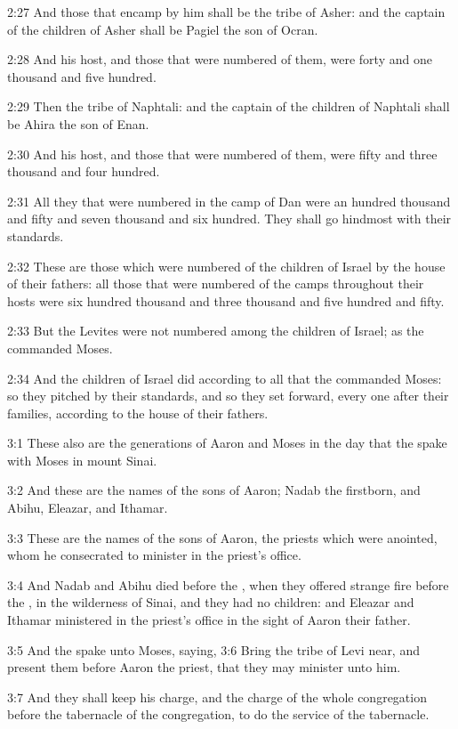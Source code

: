2:27 And those that encamp by him shall be the tribe of Asher: and the
captain of the children of Asher shall be Pagiel the son of Ocran.

2:28 And his host, and those that were numbered of them, were forty
and one thousand and five hundred.

2:29 Then the tribe of Naphtali: and the captain of the children of
Naphtali shall be Ahira the son of Enan.

2:30 And his host, and those that were numbered of them, were fifty
and three thousand and four hundred.

2:31 All they that were numbered in the camp of Dan were an hundred
thousand and fifty and seven thousand and six hundred. They shall go
hindmost with their standards.

2:32 These are those which were numbered of the children of Israel by
the house of their fathers: all those that were numbered of the camps
throughout their hosts were six hundred thousand and three thousand
and five hundred and fifty.

2:33 But the Levites were not numbered among the children of Israel;
as the \LORD commanded Moses.

2:34 And the children of Israel did according to all that the \LORD
commanded Moses: so they pitched by their standards, and so they set
forward, every one after their families, according to the house of
their fathers.

3:1 These also are the generations of Aaron and Moses in the day that
the \LORD spake with Moses in mount Sinai.

3:2 And these are the names of the sons of Aaron; Nadab the firstborn,
and Abihu, Eleazar, and Ithamar.

3:3 These are the names of the sons of Aaron, the priests which were
anointed, whom he consecrated to minister in the priest's office.

3:4 And Nadab and Abihu died before the \LORD, when they offered
strange fire before the \LORD, in the wilderness of Sinai, and they had
no children: and Eleazar and Ithamar ministered in the priest's office
in the sight of Aaron their father.

3:5 And the \LORD spake unto Moses, saying, 3:6 Bring the tribe of Levi
near, and present them before Aaron the priest, that they may minister
unto him.

3:7 And they shall keep his charge, and the charge of the whole
congregation before the tabernacle of the congregation, to do the
service of the tabernacle.

